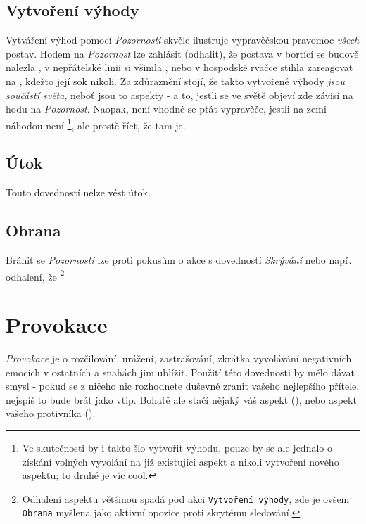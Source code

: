 \documentclass[../main.tex]{subfiles}
\begin{document}
\subsection*{Vytvoření výhody}
\label{subsec:pozornost-vytvoreni}
\vytvoreni

Vytváření výhod pomocí \textit{Pozornosti} skvěle ilustruje vypravěčskou pravomoc \textit{všech} postav. Hodem na \textit{Pozornost} lze zahlásit (odhalit), že postava v bortící se budově nalezla , v nepřátelské linii si všimla , nebo v hospodské rvačce stihla zareagovat na , kdežto její sok nikoli. Za zdůraznění stojí, že takto vytvořené výhody \textit{jsou součástí světa}, neboť jsou to aspekty - a to, jestli se ve světě objeví zde závisí na hodu na \textit{Pozornost}. Naopak, není vhodné se ptát vypravěče, jestli na zemi náhodou není  \footnote{Ve skutečnosti by i takto šlo vytvořit výhodu, pouze by se ale jednalo o získání volných vyvolání na již existující aspekt a nikoli vytvoření nového aspektu; to druhé je víc cool.}, ale prostě říct, že tam je.

\subsection*{Útok}
\label{subsec:pozornost-utok}
\utok

Touto dovedností nelze vést útok.

\subsection*{Obrana}
\label{subsec:pozornost-obrana}
\obrana

Bránit se \textit{Pozorností} lze proti pokusům o akce s dovedností \textit{Skrývání} nebo např. odhalení, že  \footnote{Odhalení aspektu většinou spadá pod akci \texttt{Vytvoření výhody}, zde je ovšem \texttt{Obrana} myšlena jako aktivní opozice proti skrytému sledování.}

\section{Provokace}
\label{sec:provokace}

\textit{Provokace} je o rozčilování, urážení, zastrašování, zkrátka vyvolávání negativních emocích v ostatních a snahách jim ublížit. Použití této dovednosti by mělo dávat smysl - pokud se z ničeho nic rozhodnete duševně zranit vašeho nejlepšího přítele, nejspíš to bude brát jako vtip. Bohatě ale stačí nějaký váš aspekt (), nebo aspekt vašeho protivníka (). 
\end{document}
